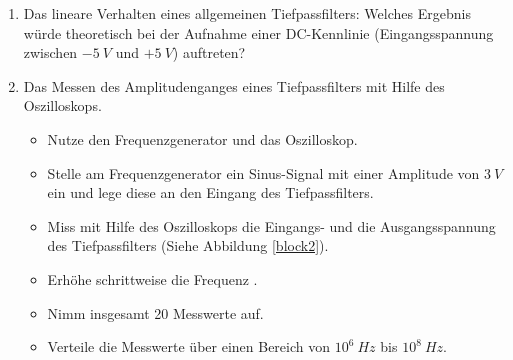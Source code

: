\begin{enumerate}
    \item Das lineare Verhalten eines allgemeinen Tiefpassfilters: Welches
      Ergebnis würde theoretisch bei der Aufnahme einer DC-Kennlinie
      (Eingangsspannung zwischen $-5~V$ und $+5~V$) auftreten?
	\item Das Messen des Amplitudenganges eines Tiefpassfilters mit Hilfe des Oszilloskops.
		\begin{itemize}
			\item Nutze den Frequenzgenerator und das Oszilloskop.
			\item Stelle am Frequenzgenerator ein Sinus-Signal mit einer Amplitude von
        $3~V$ ein und lege diese an den Eingang des Tiefpassfilters.
			\item Miss mit Hilfe des Oszilloskops die Eingangs- und die Ausgangsspannung des Tiefpassfilters (Siehe Abbildung \ref{block2}).
			\item Erhöhe schrittweise die Frequenz .
			\item Nimm insgesamt 20 Messwerte auf.
			\item Verteile die Messwerte über einen Bereich von $10^6~Hz$ bis $10^8~Hz$.

\end{itemize}
\end{enumerate}
